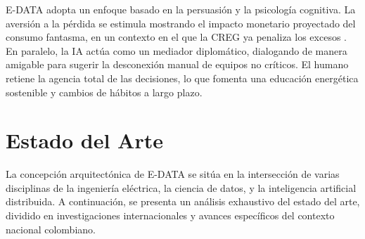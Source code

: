 \documentclass[10pt,journal,compsoc]{IEEEtran}
\begin{document}
E-DATA adopta un enfoque basado en la persuasión y la psicología cognitiva. La aversión a la pérdida se estimula mostrando el impacto monetario proyectado del consumo fantasma, en un contexto en el que la CREG ya penaliza los excesos \cite{xue2025}. En paralelo, la IA actúa como un mediador diplomático, dialogando de manera amigable para sugerir la desconexión manual de equipos no críticos. El humano retiene la agencia total de las decisiones, lo que fomenta una educación energética sostenible y cambios de hábitos a largo plazo.

\section{Estado del Arte}
La concepción arquitectónica de E-DATA se sitúa en la intersección de varias disciplinas de la ingeniería eléctrica, la ciencia de datos, y la inteligencia artificial distribuida. A continuación, se presenta un análisis exhaustivo del estado del arte, dividido en investigaciones internacionales y avances específicos del contexto nacional colombiano.
\end{document}
